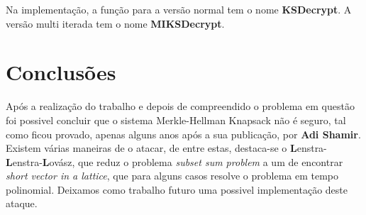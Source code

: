 \documentclass[11pt, language=portuguese]{report}
\begin{document}
Na implementação, a função para a versão normal tem o nome \textbf{KSDecrypt}. A versão multi iterada tem o nome \textbf{MIKSDecrypt}.

\chapter{Conclusões}

Após a realização do trabalho e depois de compreendido o problema em questão foi possivel concluir que o sistema Merkle-Hellman Knapsack não é seguro, tal como ficou provado, apenas alguns anos após a sua publicação, por \textbf{Adi Shamir}.
Existem várias maneiras de o atacar, de entre estas, destaca-se o \textbf{L}enstra-\textbf{L}enstra-\textbf{L}ovász\autocite{handbook}, que reduz o problema \textit{subset sum problem} a um de encontrar \textit{short vector in a lattice}, que para alguns casos resolve o problema em tempo polinomial. Deixamos como trabalho futuro uma possivel implementação deste ataque.

\printbibliography
\end{document}
